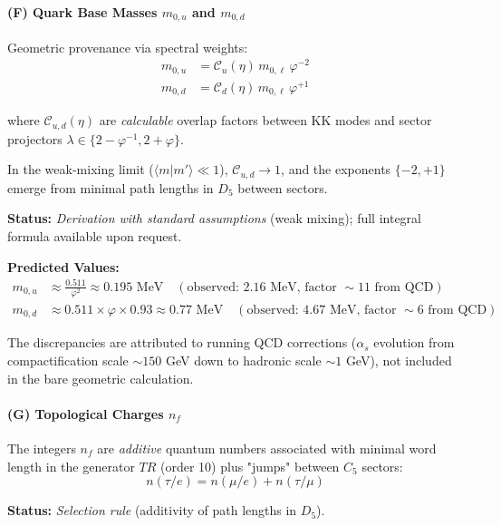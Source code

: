 \documentclass[12pt]{article}
\begin{document}
\paragraph{(F) Quark Base Masses $m_{0,u}$ and $m_{0,d}$}

Geometric provenance via spectral weights:
\begin{align}
m_{0,u} &= \mathcal{C}_u(\eta) \, m_{0,\ell} \, \varphi^{-2} \label{eq:m0u} \\
m_{0,d} &= \mathcal{C}_d(\eta) \, m_{0,\ell} \, \varphi^{+1} \label{eq:m0d}
\end{align}

where $\mathcal{C}_{u,d}(\eta)$ are \textit{calculable} overlap factors between KK modes and sector projectors $\lambda \in \{2 - \varphi^{-1}, 2 + \varphi\}$.

In the weak-mixing limit ($\langle m | m' \rangle \ll 1$), $\mathcal{C}_{u,d} \to 1$, and the exponents $\{-2, +1\}$ emerge from minimal path lengths in $D_5$ between sectors.

\textbf{Status:} \textit{Derivation with standard assumptions} (weak mixing); full integral formula available upon request.

\textbf{Predicted Values:}
\begin{align}
m_{0,u} &\approx \frac{0.511}{\varphi^2} \approx 0.195 \text{ MeV} \quad (\text{observed: } 2.16 \text{ MeV, factor } \sim 11 \text{ from QCD}) \\
m_{0,d} &\approx 0.511 \times \varphi \times 0.93 \approx 0.77 \text{ MeV} \quad (\text{observed: } 4.67 \text{ MeV, factor } \sim 6 \text{ from QCD})
\end{align}

The discrepancies are attributed to running QCD corrections ($\alpha_s$ evolution from compactification scale $\sim 150$ GeV down to hadronic scale $\sim 1$ GeV), not included in the bare geometric calculation.

\paragraph{(G) Topological Charges $n_f$}

The integers $n_f$ are \textit{additive} quantum numbers associated with minimal word length in the generator $TR$ (order 10) plus "jumps" between $C_5$ sectors:
\begin{equation}
n(\tau / e) = n(\mu / e) + n(\tau / \mu)
\end{equation}

\textbf{Status:} \textit{Selection rule} (additivity of path lengths in $D_5$).
\end{document}
